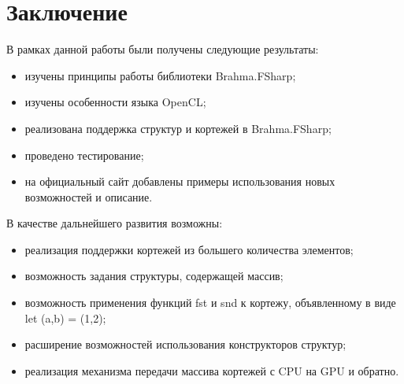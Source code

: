 \documentclass[14pt]{matmex-diploma}
\begin{document}
\section*{Заключение}
В рамках данной работы были получены следующие результаты:
\begin{itemize}
\item изучены принципы работы библиотеки Brahma.FSharp;
\item изучены особенности языка OpenCL;
\item реализована поддержка структур и кортежей в Brahma.FSharp;
\item проведено тестирование;
\item на официальный сайт добавлены примеры использования новых возможностей и описание.
\end{itemize}
В качестве дальнейшего развития возможны:
\begin{itemize}
\item реализация поддержки кортежей из большего количества элементов;
\item возможность задания структуры, содержащей массив;
\item возможность применения функций fst и snd к кортежу, объявленному в виде let (a,b) = (1,2);
\item расширение возможностей использования конструкторов структур;
\item реализация механизма передачи массива кортежей с CPU на GPU и обратно.
\end{itemize}

\setmonofont[Mapping=tex-text]{CMU Typewriter Text}


\end{document}
